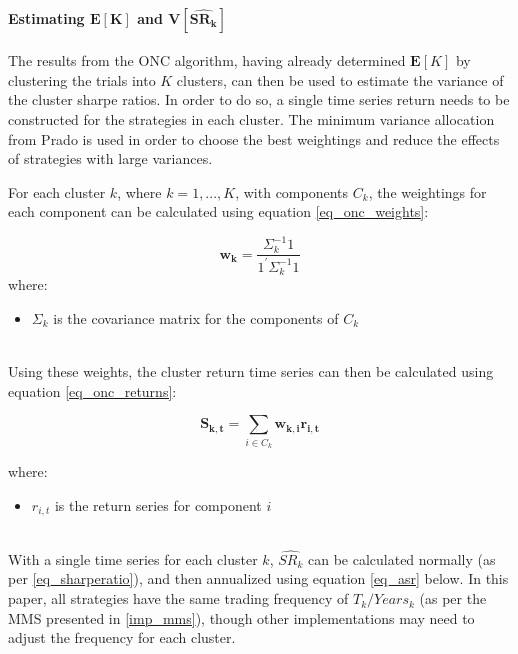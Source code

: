 \documentclass[a4paper,11pt,oneside]{article}
\theoremstyle{plain}
\theoremstyle{definition}
\begin{document}
	\paragraph{Estimating $\mathbf{E}\left[\mathbf{K}\right]$ and $\mathbf{V}\left[\widehat{\mathbf{SR_k}}\right]$}
	
	The results from the ONC algorithm, having already determined $\mathbf{E}\left[K\right]$ by clustering the trials into $K$ clusters, can then be used to estimate the variance of the cluster sharpe ratios. In order to do so, a single time series return needs to be constructed for the strategies in each cluster. The minimum variance allocation from Prado \cite{proadi2016a} is used in order to choose the best weightings and reduce the effects of strategies with large variances.\newline

	For each cluster $k$, where $k = 1, ..., K$, with components $C_k$, the weightings for each component can be calculated using equation \ref{eq_onc_weights}:
	
	\begin{equation}\label{eq_onc_weights}
	\mathbf{w_{k}}=\frac{\Sigma_{k}^{-1} 1}{1^{\prime} \Sigma_{k}^{-1} 1}
	\end{equation}
		where:
	\begin{itemize}
		\item[] $\Sigma_k$ is the covariance matrix for the components of $C_k$
	\end{itemize}
	~\\
	Using these weights, the cluster return time series can then be calculated using equation \ref{eq_onc_returns}:
	
	\begin{equation}\label{eq_onc_returns}
	\mathbf{S_{k, t}}=\sum_{i \in C_{k}} \mathbf{w_{k, i}} \mathbf{r_{i, t}}
	\end{equation}

	where:
		\begin{itemize}
			\item[] $r_{i,t}$ is the return series for component $i$
		\end{itemize}
	~\\
	With a single time series for each cluster $k$, $\widehat{SR_k}$ can be calculated normally (as per \ref{eq_sharperatio}), and then annualized using equation \ref{eq_asr} below. In this paper, all strategies have the same trading frequency of $T_k/Years_k$ (as per the MMS presented in \ref{imp_mms}), though other implementations may need to adjust the frequency for each cluster.
		
\end{document}
